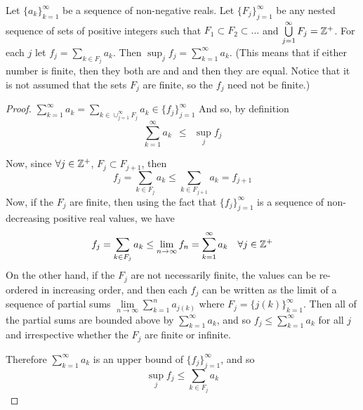 \begin{pblm}%
	Let $\{a_k\}_{k = 1}^\infty$ be a sequence of non-negative reals. Let 
	$\{F_j\}_{j = 1}^\infty$ be any nested sequence of sets of positive integers 
	such that $F_1 \subset F_2 \subset ...$ and $\bigcup\limits_{j = 1}^\infty F_j 
	= \mathbb{Z}^+$. For each $j$ let $f_j = \sum\limits_{k \in F_j} a_k$. Then 
	$\sup_j f_j = \sum\limits_{k = 1}^\infty a_k$. (This means that if either 
	number is finite, then they both are and and then they are equal. Notice 
	that it is not assumed that the sets $F_j$ are finite, so the $f_j$ need not 
	be finite.)\\
\begin{proof}

$\sum\limits_{k=1}^\infty a_k = \sum\limits_{k \in \cup_{j=1}^\infty F_j}a_k \in \{f_j\}_{j=1}^\infty$
And so, by definition 
\begin{equation*}
	\sum\limits_{k=1}^\infty a_k ~~\le~~ \sup_j f_j
\end{equation*}

Now, since $\forall j \in \mathbb{Z}^+$, $F_j \subset F_{j+1}$, then 
\begin{equation*}
f_j = \sum\limits_{k \in F_j}a_k \le \sum\limits_{k\in F_{j+1}} a_k = f_{j+1}
\end{equation*}
Now, if the $F_j$ are finite, then 
using the fact that $\{f_j\}_{j=1}^\infty$ is a sequence of non-decreasing positive 
real values, we have 
\begin{equation*}
	f_j = \sum\limits_{k\in F_j}a_k \le \lim\limits_{n\to\infty}f_n = \sum\limits_{k=1}^\infty a_k ~~~ \forall j \in \mathbb{Z}^+
\end{equation*}
On the other hand, if the $F_j$ are not necessarily finite, the values can be re-ordered in 
increasing order, and then each $f_j$ can be written 
as the limit of a sequence of partial sums 
$\lim\limits_{n\to\infty}\sum\limits_{k=1}^n a_{j(k)}$ 
where $F_j = \{j(k)\}_{k=1}^\infty$. Then all of the partial sums are bounded above by 
$\sum\limits_{k=1}^\infty a_k$, and so $f_j \le \sum\limits_{k=1}^\infty a_k$ for all $j$ 
and irrespective whether the $F_j$ are finite or infinite. 

Therefore $\sum\limits_{k=1}^\infty a_k$ is an upper bound of $\{f_j\}_{j=1}^\infty$, and so 
\begin{equation*}
	\sup_j f_j \le \sum\limits_{k\in F_j}a_k 
\end{equation*}
\end{proof}
\end{pblm}

